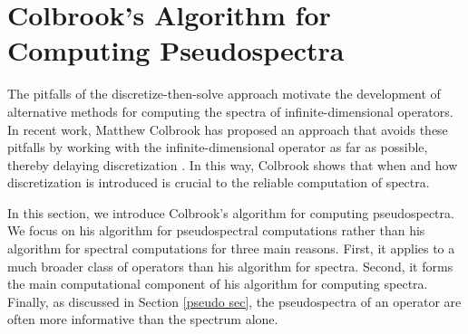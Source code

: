 

\section{Colbrook's Algorithm for Computing Pseudospectra}



The pitfalls of the discretize-then-solve approach motivate the development of alternative methods for computing the spectra of infinite-dimensional operators. In recent work, Matthew Colbrook has proposed an approach that avoids these pitfalls by working with the infinite-dimensional operator as far as possible, thereby delaying discretization \cite{Matt}. In this way, Colbrook shows that when and how discretization is introduced is crucial to the reliable computation of spectra. 


In this section, we introduce Colbrook's algorithm for computing pseudospectra. We focus on his algorithm for pseudospectral computations rather than his algorithm for spectral computations for three main reasons. First, it applies to a much broader class of operators than his algorithm for spectra. Second, it forms the main computational component of his algorithm for computing spectra. Finally, as discussed in Section \ref{pseudo sec}, the pseudospectra of an operator are often more informative than the spectrum alone. 

